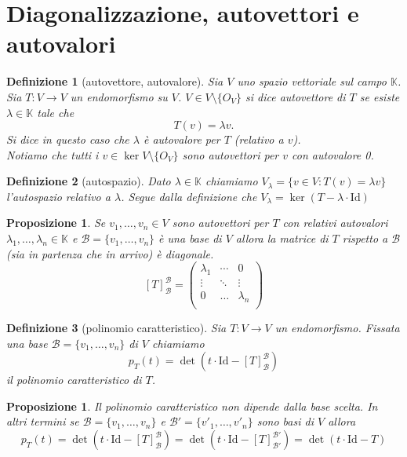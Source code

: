 \documentclass[9pt, a4paper]{article}
\newcommand{\K}{\mathbb{K}}
\newcommand{\letvs}{Sia $ V $ uno spazio vettoriale sul campo $ \K $}
\newcommand{\Id}{\mathrm{Id}}
\theoremstyle{mythm}
\newtheorem{definition}{Definizione}[section]
\newtheorem{prop}[thm]{Proposizione}
\begin{document}
\clearpage

\section{Diagonalizzazione, autovettori e autovalori}

\begin{definition}[autovettore, autovalore]
	\letvs. Sia $ T \colon V \to V $ un endomorfismo su $ V $. $ V \in V \setminus \{O_V\} $ si dice autovettore di $ T $ se esiste $ \lambda \in \K $ tale che \[T(v) = \lambda v.\] Si dice in questo caso che $ \lambda $ è autovalore per $ T $ (relativo a $ v $). \\
	Notiamo che tutti i $ v \in \ker V \setminus \{O_V\} $ sono autovettori per $ v $ con autovalore 0.  
\end{definition}

\begin{definition}[autospazio]
	Dato $ \lambda \in \K $ chiamiamo $ V_\lambda = \{v \in V : T(v) = \lambda v\} $ l'autospazio relativo a $ \lambda $. Segue dalla definizione che $ V_\lambda = \ker \left(T - \lambda \cdot \Id\right) $
\end{definition}

\begin{prop}
	Se $ v_1, \ldots, v_n \in V $ sono autovettori per $ T $ con relativi autovalori $ \lambda_1, \ldots, \lambda_n \in \K $ e $ \mathscr{B} = \{v_1, \ldots, v_n\} $ è una base di $ V $ allora la matrice di $ T $ rispetto a $ \mathscr{B} $ (sia in partenza che in arrivo) è diagonale. 
	\[[T]_{\mathscr{B}}^{\mathscr{B}} = 
	\begin{pmatrix}
	\lambda_1 & \cdots & 0 \\
	\vdots & \ddots & \vdots \\
	0 & \ldots & \lambda_n \\
	\end{pmatrix}\]
\end{prop}

\begin{definition}[polinomio caratteristico]
	Sia $ T \colon V \to V $ un endomorfismo. Fissata una base $ \mathscr{B} = \{v_1, \ldots, v_n\} $ di $ V $ chiamiamo \[p_T(t) = \det \left(t \cdot \Id - [T]_{\mathscr{B}}^{\mathscr{B}}\right)\] il polinomio caratteristico di $ T $. 
\end{definition}

\begin{prop}
	Il polinomio caratteristico non dipende dalla base scelta. In altri termini se $ \mathscr{B} = \{v_1, \ldots, v_n\} $ e $ \mathscr{B}' = \{v'_1, \ldots, v'_n\} $ sono basi di $ V $ allora \[p_T(t) = \det \left(t \cdot \Id - [T]_{\mathscr{B}}^{\mathscr{B}}\right) = \det \left(t \cdot \Id - [T]_{\mathscr{B}'}^{\mathscr{B}'}\right) = \det \left(t \cdot \Id - T\right)\]
\end{prop}
\end{document}
